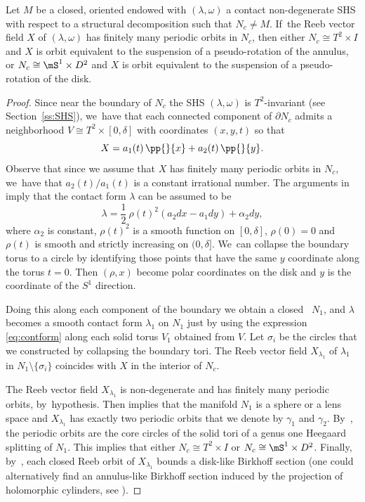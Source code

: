\begin{lemma}\label{lem:reebpseudo}
Let $M$ be a closed, oriented \threemanifold endowed with $(\lambda,\omega)$ a contact non-degenerate SHS with respect to a structural decomposition such that $N_c\neq M$. If~the Reeb vector field $X$ of $(\lambda, \omega)$ has finitely many periodic orbits in $N_c$, then either $N_c\cong T^2\times I$ and $X$ is orbit equivalent to the suspension of a pseudo-rotation of the annulus, or $N_c\cong \mS^1\times D^2$ and $X$ is orbit equivalent to the suspension of a pseudo-rotation of the disk.
\end{lemma}

\begin{proof}
Since near the boundary of $N_c$ the SHS $(\lambda, \omega)$ is $T^2$-invariant (see Section~\ref{ss:SHS}), we~have that each connected component of $\partial N_c$ admits a neighborhood $V\cong T^2\times [0,\delta]$ with coordinates $(x,y,t)$ so that
\begin{equation}\label{eq:reebinv}
X=a_1(t)\,\pp{}{x} + a_2(t)\, \pp{}{y}.
\end{equation}
{Observe that since we assume that $X$ has finitely many periodic orbits in $N_c$, we~have that $a_2(t)/a_1(t)$ is a constant irrational number. The arguments in \cite[\S 5.2]{HT} imply that the contact form $\lambda$} can be assumed to be
\begin{equation}\label{eq:contform}
\lambda= \frac{1}{2}\ \rho(t)^2 (a_2dx-a_1dy) + \alpha_2 dy,
\end{equation}
where $\alpha_2$ is constant, $\rho(t)^2$ is a smooth function on $[0,\delta]$, $\rho(0)=0$ and $\rho(t)$ is smooth and strictly increasing on $(0,\delta]$. We~can collapse the boundary torus to a circle by identifying those points that have the same $y$ coordinate along the torus $t=0$. Then $(\rho,x)$ become polar coordinates on the disk and $y$ is the coordinate of the $S^1$ direction.

Doing this along each component of the boundary we obtain a closed \threemanifold~$N_1$, and $\lambda$ becomes a smooth contact form $\lambda_1$ on $N_1$ just by using the expression \eqref{eq:contform} along each solid torus $V_1$ obtained from $V$. Let $\sigma_i$ be the circles that we constructed by collapsing the boundary tori. The Reeb vector field $X_{\lambda_1}$ of $\lambda_1$ in $N_1\setminus \{\sigma_i\}$ coincides with $X$ in the interior of $N_c$.

The Reeb vector field $X_{\lambda_1}$ is non-degenerate and has finitely many periodic orbits, by~hypothesis. Then \cite[Th.\,1.2]{CDR} implies that the manifold $N_1$ is a sphere or a lens space and $X_{\lambda_1}$ has exactly two periodic orbits that we denote by $\gamma_1$ and $\gamma_2$. By~\cite[Th.\,1.2]{HT}, the periodic orbits are the core circles of the solid tori of a genus one Heegaard splitting of $N_1$. This implies that either $N_c\cong T^2\times I$ or $N_c \cong \mS^1 \times D^2$. Finally, by~\cite[Cor.\,1.10]{CGHHL}, each closed Reeb orbit of $X_{\lambda_1}$ bounds a disk-like Birkhoff section (one could alternatively find an annulus-like Birkhoff section induced by the projection of holomorphic cylinders, see \cite[\S 4.6]{HT}).


\end{proof}
